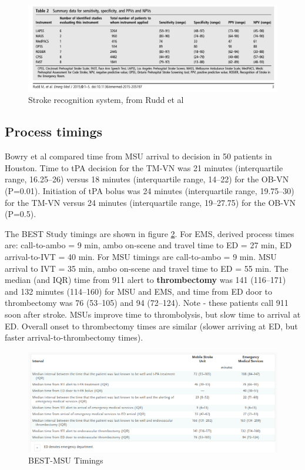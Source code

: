 \begin{figure}
    \centering
    \includegraphics[width=0.9\linewidth]{images_background/rudd.png}
    \caption{Stroke recognition system, from Rudd et al}
    \label{fig:rudd}
\end{figure}










\subsection{Process timings}

Bowry et al \cite{bowry_time_2018} compared time from MSU arrival to decision in 50 patients in Houston. Time to tPA decision for the TM-VN was 21 minutes (interquartile range, 16.25–26) versus 18 minutes (interquartile range, 14–22) for the OB-VN (P=0.01). Initiation of tPA bolus was 24 minutes (interquartile range, 19.75–30) for the TM-VN versus 24 minutes (interquartile range, 19–27.75) for the OB-VN (P=0.5).

The BEST Study \cite{grotta_prospective_2021} timings are shown in figure \ref{fig:best_msu_timings}. For EMS, derived process times are: call-to-ambo = 9 min, ambo on-scene and travel time to ED = 27 min, ED arrival-to-IVT = 40 min. For MSU timings are call-to-ambo = 9 min. MSU arrival to IVT = 35 min, ambo on-scene and travel time to ED = 55 min. The median (and IQR) time from 911 alert to \textbf{thrombectomy} was 141 (116–171) and 132 minutes (114–160) for MSU and EMS, and  time from ED door to thrombectomy was 76 (53–105) and 94 (72–124). Note - these patients call 911 soon after stroke. MSUs improve time to thrombolysis, but slow time to arrival at ED. Overall onset to thrombectomy times are similar (slower arriving at ED, but faster arrival-to-thrombectomy times). 

\begin{figure}
    \centering
    \includegraphics[width=0.75\linewidth]{images_background/best_msu_timings.png}
    \caption{BEST-MSU Timings}
    \label{fig:best_msu_timings}
\end{figure}




